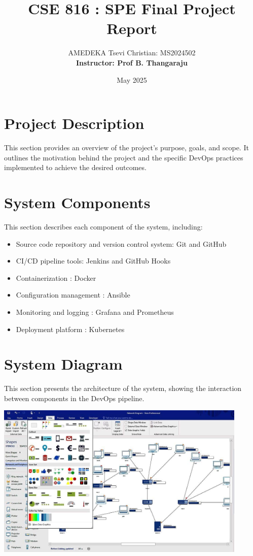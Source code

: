 \documentclass[12pt]{article}
\title{\textbf{CSE 816 : SPE Final Project Report}}
\author{
    AMEDEKA Tsevi Christian: MS2024502
    \\[2\baselineskip]
    \textbf{Instructor: Prof B. Thangaraju}
}
\date{May 2025}
\begin{document}
\maketitle
\newpage
\tableofcontents
\listoffigures
\newpage

\section{Project Description}
This section provides an overview of the project's purpose, goals, and scope. It outlines the motivation behind the project and the specific DevOps practices implemented to achieve the desired outcomes.

\section{System Components}
This section describes each component of the system, including:
\begin{itemize}
    \item Source code repository and version control system: Git and GitHub
    \item CI/CD pipeline tools: Jenkins and GitHub Hooks
    \item Containerization : Docker
    \item Configuration management : Ansible
    \item Monitoring and logging : Grafana and Prometheus
    \item Deployment platform : Kubernetes
\end{itemize}

\section{System Diagram}
This section presents the architecture of the system, showing the interaction between components in the DevOps pipeline.\\
 
\begin{center}
    \includegraphics[width=0.9\textwidth]{diagram.png}
     \label{diagram.png}
\end{center}
\end{document}
